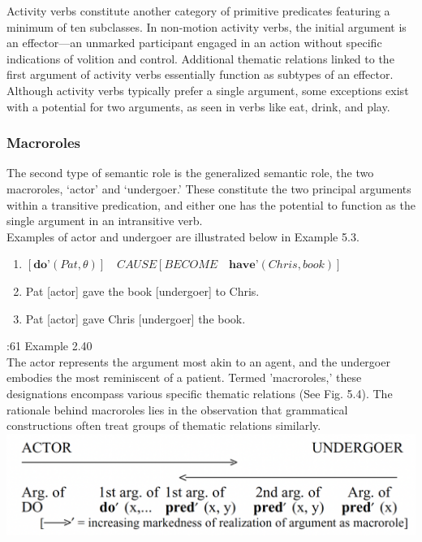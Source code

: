 Activity verbs constitute another category of primitive predicates featuring a minimum of ten subclasses. In non-motion activity verbs, the initial argument is an effector—an unmarked participant engaged in an action without specific indications of volition and control. Additional thematic relations linked to the first argument of activity verbs essentially function as subtypes of an effector. Although activity verbs typically prefer a single argument, some exceptions exist with a potential for two arguments, as seen in verbs like eat, drink, and play.


\subsubsection{Macroroles}

The second type of semantic role is the generalized semantic role, the
two macroroles, ‘actor’ and ‘undergoer.’ These constitute the two principal arguments within a transitive predication, and either one has the potential to function as the single argument in an intransitive verb. \\


Examples of actor and undergoer are illustrated below in Example 5.3. \\

\begin{enumerate}
    \item $[\textbf{do'} (Pat, \theta)] \hspace{1em}CAUSE [BECOME \hspace{1em}\textbf{have'} (Chris, book)]$
    \item Pat [actor] gave the book [undergoer] to Chris.
    \item Pat [actor] gave Chris [undergoer] the book.
\end{enumerate}

\textcite{van2005exploring}:61 Example 2.40 \\

The actor represents the argument most akin to an agent, and the undergoer embodies the most reminiscent of a patient. Termed 'macroroles,' these designations encompass various specific thematic relations (See Fig. 5.4). The rationale behind macroroles lies in the observation that grammatical constructions often treat groups of thematic relations similarly.\\

\includegraphics[width=\textwidth]{figures/macroroles-hierarchy.png}
 \hfill


